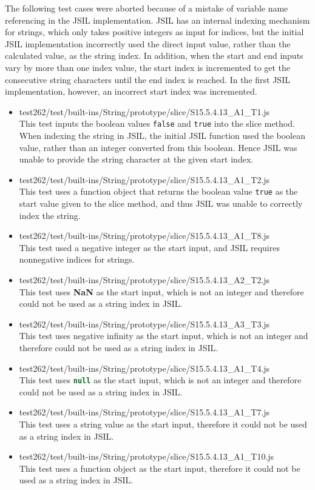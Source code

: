 \documentclass[a4paper,11pt,twoside]{report}
\def\jsinline{\lstinline[language=JavaScript, basicstyle=\small]}%\end{lstlisting}
\begin{document}
\begin{itemize}
The following test cases were aborted because of a mistake of variable name referencing in the JSIL implementation. JSIL has an internal indexing mechanism for strings, which only takes positive integers as input for indices, but the initial JSIL implementation incorrectly used the direct input value, rather than the calculated value, as the string index. In addition, when the start and end inputs vary by more than one index value, the start index is incremented to get the consecutive string characters until the end index is reached. In the first JSIL implementation, however, an incorrect start index was incremented.
\begin{itemize}
\item test262/test/built-ins/String/prototype/slice/S15.5.4.13\_A1\_T1.js \\
This test inputs the boolean values \texttt{false} and \texttt{true} into the slice method. When indexing the string in JSIL, the initial JSIL function used the boolean value, rather than an integer converted from this boolean. Hence JSIL was unable to provide the string character at the given start index.
\item test262/test/built-ins/String/prototype/slice/S15.5.4.13\_A1\_T2.js \\
This test uses a function object that returns the boolean value \texttt{true} as the start value given to the slice method, and thus JSIL was unable to correctly index the string.
\item test262/test/built-ins/String/prototype/slice/S15.5.4.13\_A1\_T8.js \\
This test used a negative integer as the start input, and JSIL requires nonnegative indices for strings.
\item test262/test/built-ins/String/prototype/slice/S15.5.4.13\_A2\_T2.js \\
This test uses \textbf{NaN} as the start input, which is not an integer and therefore could not be used as a string index in JSIL.
\item test262/test/built-ins/String/prototype/slice/S15.5.4.13\_A3\_T3.js \\
This test uses negative infinity as the start input, which is not an integer and therefore could not be used as a string index in JSIL.
\item test262/test/built-ins/String/prototype/slice/S15.5.4.13\_A1\_T4.js \\
This test uses \jsinline|null| as the start input, which is not an integer and therefore could not be used as a string index in JSIL.
\item test262/test/built-ins/String/prototype/slice/S15.5.4.13\_A1\_T7.js \\
This test uses a string value as the start input, therefore it could not be used as a string index in JSIL.
\item test262/test/built-ins/String/prototype/slice/S15.5.4.13\_A1\_T10.js \\
This test uses a function object as the start input, therefore it could not be used as a string index in JSIL.
\end{itemize}


\end{itemize}
\end{document}
